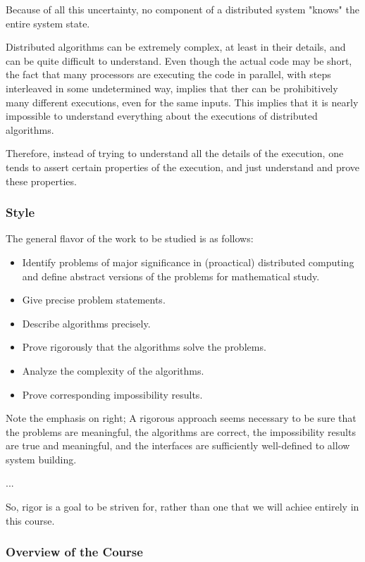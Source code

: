 \documentclass{report}
\theoremstyle{plain}
\theoremstyle{definition}
\theoremstyle{remark}
\begin{document}
Because of all this uncertainty, no component of a distributed system "knows" the 
entire system state. 

Distributed algorithms can be extremely complex, at least in their details, 
and can be quite difficult to understand. Even though the actual code may be
short, the fact that many processors are executing the code in parallel, 
with steps interleaved in some undetermined way, implies that ther can be 
prohibitively many different executions, even for the same inputs. This implies
that it is nearly impossible to understand everything about the executions of 
distributed algorithms. 

Therefore, instead of trying to understand all the details of the execution, 
one tends to assert certain properties of the execution, and just understand
and prove these properties.

\subsubsection{Style}

The general flavor of the work to be studied is as follows:
\begin{itemize}
    \item Identify problems of major significance in (proactical) distributed 
    computing and define abstract versions of the problems for mathematical 
    study. 
    \item Give precise problem statements.
    \item Describe algorithms precisely. 
    \item Prove rigorously that the algorithms solve the problems. 
    \item Analyze the complexity of the algorithms. 
    \item Prove corresponding impossibility results. 
\end{itemize}

Note the emphasis on right; A rigorous approach seems necessary to be sure that
the problems are meaningful, the algorithms are correct, the impossibility results
are true and meaningful, and the interfaces are sufficiently well-defined to 
allow system building. 

...

So, rigor is a goal to be striven for, rather than one that we will achiee entirely
in this course.

\subsubsection{Overview of the Course}
\end{document}
